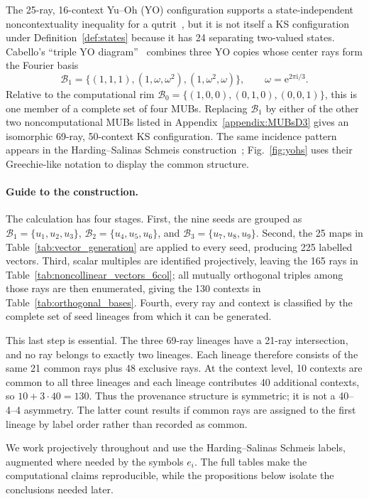 \documentclass[%
  reprint,
  superscriptaddress,
  showpacs,
  showkeys,
  amsmath,amssymb,
  pra,
  longbibliography,
  floatfix,
  x11names
]{revtex4-2}
\newcommand{\ii}{\mathrm{i}}
\newenvironment{revision}{\begingroup\color{revisionblue}}{\endgroup}
\begin{document}
\begin{revision}
The 25-ray, 16-context Yu--Oh (YO) configuration supports a state-independent noncontextuality inequality for a qutrit~\cite{PhysRevLett.103.050401,Yu-2012,Yu2015}, but it is not itself a KS configuration under Definition~\ref{def:states} because it has 24 separating two-valued states.  Cabello's ``triple YO diagram''~\cite{Cabello2025} combines three YO copies whose center rays form the Fourier basis
\[
\mathcal{B}_1=\{(1,1,1),(1,\omega,\omega^2),(1,\omega^2,\omega)\},
\qquad \omega=\mathrm{e}^{2\pi\ii{}/3}.
\]
Relative to the computational rim $\mathcal{B}_0=\{(1,0,0),(0,1,0),(0,0,1)\}$, this is one member of a complete set of four MUBs.  Replacing $\mathcal{B}_1$ by either of the other two noncomputational MUBs listed in Appendix~\ref{appendix:MUBsD3} gives an isomorphic 69-ray, 50-context KS configuration.  The same incidence pattern appears in the Harding--Salinas Schmeis construction~\cite[Fig.~2 and Theorem~2.6]{harding2025remarksIJTP}; Fig.~\ref{fig:yohs} uses their Greechie-like notation to display the common structure.

\paragraph{Guide to the construction.}
The calculation has four stages.  First, the nine seeds are grouped as $\mathcal{B}_1=\{u_1,u_2,u_3\}$, $\mathcal{B}_2=\{u_4,u_5,u_6\}$, and $\mathcal{B}_3=\{u_7,u_8,u_9\}$.  Second, the 25 maps in Table~\ref{tab:vector_generation} are applied to every seed, producing 225 labelled vectors.  Third, scalar multiples are identified projectively, leaving the 165 rays in Table~\ref{tab:noncollinear_vectors_6col}; all mutually orthogonal triples among those rays are then enumerated, giving the 130 contexts in Table~\ref{tab:orthogonal_bases}.  Fourth, every ray and context is classified by the complete set of seed lineages from which it can be generated.

This last step is essential.  The three 69-ray lineages have a 21-ray intersection, and no ray belongs to exactly two lineages.  Each lineage therefore consists of the same 21 common rays plus 48 exclusive rays.  At the context level, 10 contexts are common to all three lineages and each lineage contributes 40 additional contexts, so $10+3\cdot40=130$.  Thus the provenance structure is symmetric; it is not a 40--4--4 asymmetry.  The latter count results if common rays are assigned to the first lineage by label order rather than recorded as common.

We work projectively throughout and use the Harding--Salinas Schmeis labels, augmented where needed by the symbols $e_i$.  The full tables make the computational claims reproducible, while the propositions below isolate the conclusions needed later.
\end{revision}
\end{document}
